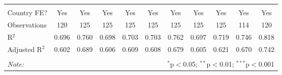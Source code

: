 \begin{table}[!htbp]
\begin{tabular}{@{\extracolsep{5pt}}lcccccccccc}
  & & & & & & & & & & \\ 
\hline \\[-1.8ex] 
Country FE? & Yes & Yes & Yes & Yes & Yes & Yes & Yes & Yes & Yes & Yes \\ 
Observations & 120 & 125 & 125 & 125 & 125 & 125 & 125 & 125 & 114 & 120 \\ 
R$^{2}$ & 0.696 & 0.760 & 0.698 & 0.703 & 0.703 & 0.762 & 0.697 & 0.719 & 0.746 & 0.818 \\ 
Adjusted R$^{2}$ & 0.602 & 0.689 & 0.606 & 0.609 & 0.608 & 0.679 & 0.605 & 0.621 & 0.670 & 0.742 \\ 
\hline 
\hline \\[-1.8ex] 
\textit{Note:}  & \multicolumn{10}{r}{$^{*}$p$<$0.05; $^{**}$p$<$0.01; $^{***}$p$<$0.001} \\ 
\end{tabular} 
\end{table} 
